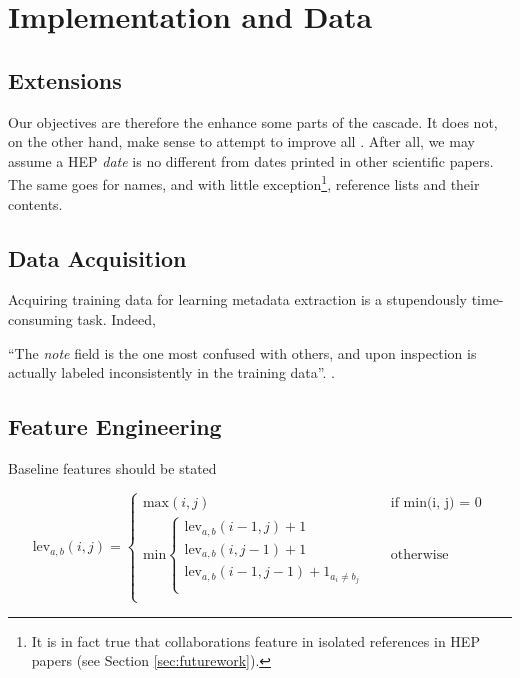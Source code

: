 
\chapter{Implementation and Data} %

\label{Chapter4} %



\section{Extensions}

Our objectives are therefore the enhance some parts of the cascade. It does not, on the other hand, make sense to attempt to improve all . After all, we may assume a HEP \emph{date} is no different from dates printed in other scientific papers. The same goes for names, and with little exception\footnote{It is in fact true that collaborations feature in isolated references in HEP papers (see Section \ref{sec:futurework}).}, reference lists and their contents.

\section{Data Acquisition}

Acquiring training data for learning metadata extraction is a stupendously time-consuming task. Indeed, 

``The \emph{note} field is the one most confused with others, and upon inspection is actually labeled inconsistently in the training data''. \cite{Peng04accurateinformation}.

\section{Feature Engineering}

Baseline features should be stated 

\[
  \text{lev}_{a, b}(i, j) = 
  \begin{cases} 
  	\text{max}(i, j) &\quad\text{if min(i, j) = 0} \\
	\text{min}
		\begin{cases}
			\text{lev}_{a, b}(i - 1, j) + 1 \\
			\text{lev}_{a, b}(i, j - 1) + 1 \\
			\text{lev}_{a, b}(i - 1, j - 1) + 1_{a_i \neq b_j} \\
		\end{cases} &\quad\text{otherwise} \\
  \end{cases}
\]

